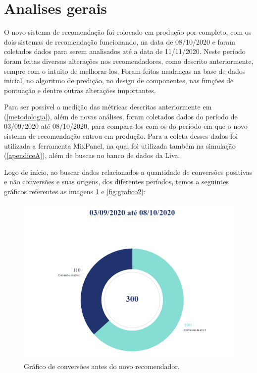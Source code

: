 \section{Analises gerais}
\label{analise_gerais}

O novo sistema de recomendação foi colocado em produção por completo, com os dois sistemas de recomendação funcionando, na data de 08/10/2020 e foram coletados dados para serem analisados até a data de 11/11/2020. Neste período foram feitas diversas alterações nos recomendadores, como descrito anteriormente, sempre com o intuito de melhorar-los. Foram feitas mudanças na base de dados inicial, no algoritmo de predição, no design de componentes, nas funções de pontuação e dentre outras alterações importantes.

Para ser possível a medição das métricas descritas anteriormente em (\ref{metodologia}), além de novas análises, foram coletados dados do período de 03/09/2020 até 08/10/2020, para compara-los com os do período em que o novo sistema de recomendação entrou em produção. Para a coleta desses dados foi utilizada a ferramenta MixPanel, na qual foi utilizada também na simulação (\ref{apendiceA}), além de buscas no banco de dados da Liva.

Logo de início, ao buscar dados relacionados a quantidade de conversões positivas e não conversões e suas origens, dos diferentes períodos, temos a seguintes gráficos referentes as imagens \ref{fig:grafico1} e \ref{fig:grafico2}:

\begin{figure}[H]
    \centering
    \includegraphics[scale=0.6]{figuras/desenvolvimento/grafico1.png}
    \caption[Gráfico de conversões antes do novo recomendador]{Gráfico de conversões antes do novo recomendador.}
    \label{fig:grafico1}
\end{figure}


